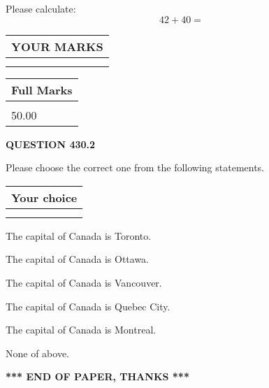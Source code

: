 \documentclass[12pt]{article}
\begin{document}
  
 
Please calculate:
\begin{equation}
42 +  %
40 = \nonumber
\end{equation}
 

 

 
  
\vspace{0.2in}
  
\noindent\begin{tabular}{|l|}
\hline
 YOUR MARKS  \\
\hline
 \\ 
 \\ 
\hline
\end{tabular}
\hspace{0.05in} \begin{tabular}{|l|}
\hline
 Full Marks  \\
\hline
 \\ 
50.00 \\
\hline
\end{tabular}
{\textbf{\Large{QUESTION
430.2 
}}}
  
  
Please choose the correct one from the following statements.
  
  
\noindent\hspace{3.0in} \begin{tabular}{|l|}
\hline
Your choice \\
\hline
 \\ 
 \\ 
\hline
\end{tabular}
  
  
 
 
The capital of Canada is Toronto.
 
 
The capital of Canada is Ottawa.
 
 
The capital of Canada is Vancouver.
 
 
The capital of Canada is Quebec City.
 
 
The capital of Canada is Montreal.
 
 
 None of above.
 
 
   
   
 \vspace{0.2in}
 
   
   
   
   
\vspace{1.0in} 
{\textbf{\large{ *** END OF PAPER, THANKS *** }}} 
   
\end{document}
